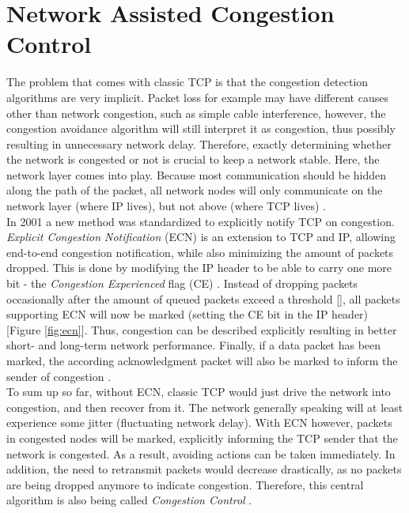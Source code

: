 \documentclass[a4paper,conference]{IEEEtran}
\begin{document}
\section{Network Assisted Congestion Control}
The problem that comes with classic TCP is that the congestion detection algorithms are very implicit. Packet loss for example may have different causes other than network congestion, such as simple cable interference, however, the congestion avoidance algorithm will still interpret it as congestion, thus possibly resulting in unnecessary network delay. Therefore, exactly determining whether the network is congested or not is crucial to keep a network stable. Here, the network layer comes into play. Because most communication should be hidden along the path of the packet, all network nodes will only communicate on the network layer (where IP lives), but not above (where TCP lives) \cite{ramakrishnan1999proposal}.\\
In 2001 a new method was standardized to explicitly notify TCP on congestion. \textit{Explicit Congestion Notification} (ECN) is an extension to TCP and IP, allowing end-to-end congestion notification, while also minimizing the amount of packets dropped. This is done by modifying the IP header to be able to carry one more bit - the \textit{Congestion Experienced} flag (CE) \cite{ramakrishnan1999proposal}. Instead of dropping packets occasionally after the amount of queued packets exceed a threshold [], all packets supporting ECN will now be marked (setting the CE bit in the IP header) [Figure \ref{fig:ecn}]. Thus, congestion can be described explicitly resulting in better short- and long-term network performance. Finally, if a data packet has been marked, the according acknowledgment packet will also be marked to inform the sender of congestion \cite{ramakrishnan1999proposal,ramakrishnan2001addition,10.1145/205511.205512}.\\
To sum up so far, without ECN, classic TCP would just drive the network into congestion, and then recover from it. The network generally speaking will at least experience some jitter (fluctuating network delay). With ECN however, packets in congested nodes will be marked, explicitly informing the TCP sender that the network is congested. As a result, avoiding actions can be taken immediately. In addition, the need to retransmit packets would decrease drastically, as no packets are being dropped anymore to indicate congestion. Therefore, this central algorithm is also being called \textit{Congestion Control} \cite{ramakrishnan1999proposal,ramakrishnan2001addition}.
\end{document}

